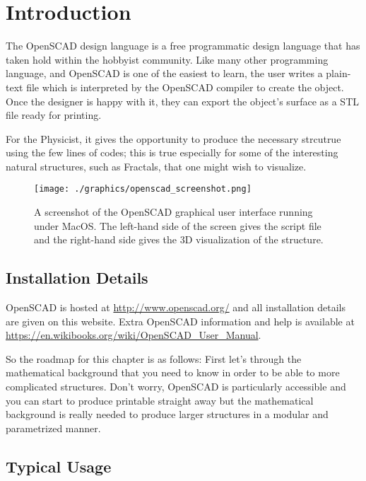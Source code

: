 \section{Introduction}

The OpenSCAD design language is a free programmatic design language that has taken hold within the hobbyist community. Like many other programming language, and OpenSCAD is one of the easiest to learn, the user writes a plain-text file which is interpreted by the OpenSCAD compiler to create the object. Once the designer is happy with it, they can export the object's surface as a STL file ready for printing. 

For the Physicist, it gives the opportunity to produce the necessary strcutrue using the few lines of codes; this is true especially for some of the interesting natural structures, such as Fractals, that one might wish to visualize. 

\begin{figure}[h]
 \centering
 \texttt{[image: ./graphics/openscad\_screenshot.png]}
 \caption{A screenshot of the OpenSCAD graphical user interface running under MacOS. The left-hand side of the screen gives the script file and the right-hand side gives the 3D visualization of the structure.}
\end{figure}

\subsection{Installation Details}

OpenSCAD is hosted at \url{http://www.openscad.org/} and all installation details are given on this website. Extra OpenSCAD information and help is available at \url{https://en.wikibooks.org/wiki/OpenSCAD_User_Manual}. 

So the roadmap for this chapter is as follows: First let's through the mathematical background that you need to know in order to be able to more complicated structures. Don't worry, OpenSCAD is particularly accessible and you can start to produce printable straight away but the mathematical background is  really needed to produce larger structures in a modular and parametrized manner. 

\subsection{Typical Usage}

